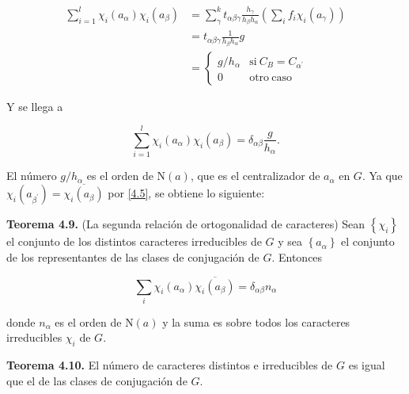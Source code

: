 \documentclass[12pt]{book}
\theoremstyle{definition}
\newcounter{in}
\begin{document}
\begin{equation*}
  \begin{aligned}
    \sum_{i=1}^{l} \chi_{i}(a_{\alpha}) \chi_{i}(a_{\beta}) &= \sum_{\gamma}^{k} t_{\alpha \beta \gamma} \frac{h_{\gamma}}{h_{\beta} h_{\alpha}} (\sum_{i} f_{i} \chi_{i}(a_{\gamma})) \\
    &= t_{\alpha \beta \gamma} \frac{1}{h_{\beta} h_{\alpha}}g \\
    &=  \left\{
	       \begin{array}{ll}
		 g/h_{\alpha}      & \mathrm{si\ } C_{B} = C_{\alpha^{'}} \\
		 0      & \mathrm{otro\ caso\ } 
	       \end{array}
	     \right.
    \end{aligned}
\end{equation*}

Y se llega a

\begin{equation*}
   \sum_{i=1}^{l} \chi_{i}(a_{\alpha}) \chi_{i}(a_{\beta})=\delta_{\alpha \beta} \frac{g}{h_{\alpha}}.
\end{equation*}

El número $g/h_{\alpha}$ es el orden de $\mathrm{N}(a)$, que es el
centralizador de $a_{\alpha}$ en $G$. Ya que
$\chi_{i}(a_{\beta^{'}})=\overline{\chi_{i} (a_{\beta})}$ por
\ref{4.5}, se obtiene lo siguiente:

\textbf{Teorema 4.9. } (La segunda relación de ortogonalidad de
caracteres) Sean $\left\{\chi_{i} \right\}$ el conjunto de los
distintos caracteres irreducibles de $G$ y sea
$\left\{a_{\alpha} \right\}$ el conjunto de los representantes de las
clases de conjugación de $G$. Entonces

\begin{equation*}
  \sum_{i} \chi_{i}(a_{\alpha}) \overline{\chi_{i} (a_{\beta})} = \delta_{\alpha \beta} n_{\alpha}
\end{equation*}

donde $n_{\alpha}$ es el orden de $\mathrm{N}(a)$ y la suma es sobre
todos los caracteres irreducibles $\chi_{i}$ de $G$.

\textbf{Teorema  4.10. } El número de caracteres distintos e irreducibles de $G$ es
igual que el de las clases de conjugación de $G$.
\end{document}

